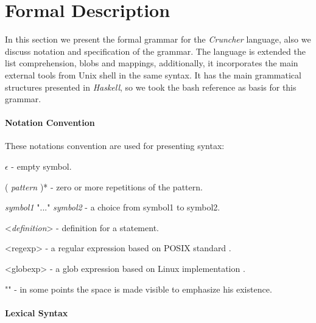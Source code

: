 \documentclass{article}
\begin{document}
\section{Formal Description}
\label{sec:formal}
In this section we present the formal grammar for the \textit{Cruncher}
language, also we discuss notation and specification of the grammar. The
language is extended the list comprehension, blobs and mappings, additionally,
it incorporates the main external tools from Unix shell in the same syntax. It
has the main grammatical structures presented in \textit{Haskell}, so we took
the bash reference \cite{marlow2010haskell} as basis for this grammar.

\paragraph{Notation Convention}
These notations convention are used for presenting syntax:

\begin{grammar}
\item $\epsilon$ - empty symbol.

\item ( \textit{pattern} )* - zero or more repetitions of the pattern.

\item \textit{symbol1} "..." \textit{symbol2} - a choice from symbol1 to symbol2.

\item <\textit{definition}> - definition for a statement.

\item <regexp> - a regular expression based on POSIX standard \cite{posix}.

\item <globexp> - a glob expression based on Linux implementation \cite{glob}.

\item "\textvisiblespace" - in some points the space is made visible to
    emphasize his existence.
\end{grammar}

\paragraph{Lexical Syntax}
\end{document}
